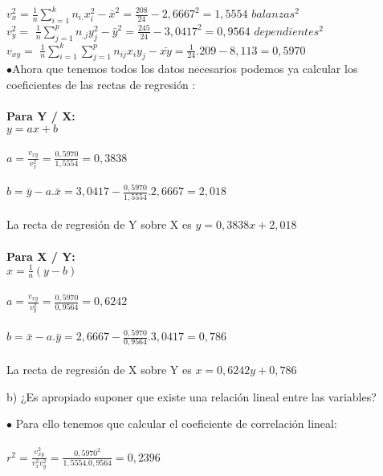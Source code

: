 \documentclass{article}
\begin{document}
	
	
	$v_{x}^{2} =  $$\frac{1}{n}\sum^{k}_{i=1}n_{i.}x_{i}^{2} - \bar{x}^{2} = \frac{208}{24} - 2,6667^{2} = 1,5554 $ $ balanzas^{2} $ \\
	
	$v_{y}^{2} = $ $\frac{1}{n}\sum^{p}_{j=1}n_{.j}y_{j}^{2} - \bar{y}^{2} = \frac{245}{24} - 3,0417 ^{2} = 0,9564 $ $dependientes^{2}$ \\
	
	$v_{xy} = $ $\frac{1}{n}\sum^{k}_{i=1}\sum^{p}_{j=1}n_{ij}x_{i}y_{j} - \bar{xy}= \frac{1}{24}.209 - 8,113 = 0,5970 $ \\
	
	
	$\bullet$Ahora que tenemos todos los datos necesarios podemos ya calcular los coeficientes de las rectas de regresión :\\ \\
	\textbf{Para Y / X:}\\
	$y = ax +b $\\ \\
	$a = \frac{v_{xy}}{v_{x}^{2}} = \frac{0,5970}{1,5554} = 0,3838$\\ \\
	$b = \bar{y} - a.\bar{x} = 3,0417 - \frac{0,5970}{1,5554}. 2,6667 = 2,018$\\ \\
	La recta de regresión de Y sobre X es
	$y = 0,3838x + 2,018 $\\ \\
	\textbf{Para X / Y:}\\
	$x = \frac{1}{a}( y- b) $\\ \\
	$a = \frac{v_{xy}}{v_{y}^{2}} = \frac{0,5970}{ 0,9564 } = 0,6242$\\ \\
	$b = \bar{x} - a.\bar{y} = 2,6667 -  \frac{0,5970}{ 0,9564 }.3,0417 = 0,786$\\ \\La recta de regresión de X sobre Y es
	$x = 0,6242y +  0,786 $\\ 
	
	\begin{flushleft}
		b) ¿Es apropiado suponer que existe una relación lineal entre las variables?
	\end{flushleft}
	
	
	$\bullet$ Para ello tenemos que calcular el coeficiente de correlación lineal:\\ \\
	
	$r^{2} = \frac{v_{xy}^{2}}{v_{x}^{2}v_{y}^{2}} = \frac{0,5970^{2}}{1,5554 . 0,9564} = 0,2396$\\ \\
 
\end{document}
